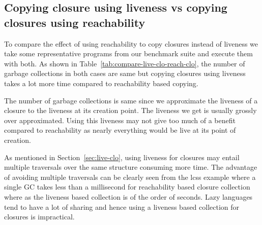 \documentclass[9pt]{sigplanconf}
\newcommand{\comment}[1]{{\color{Myblue}{(#1)}}}
\begin{document}

\subsection{Copying closure using liveness vs copying closures using reachability}\label{sec:strategies}

To compare the  effect of using reachability to  copy closures instead
of liveness we take some representative programs from our benchmark suite and
execute       them      with       both.        As      shown       in
Table~\ref{tab:compare-live-clo-reach-clo},  the   number  of  garbage
collections in both cases are same but copying closures using liveness
takes a lot more time compared to reachability based copying.

The number  of garbage  collections is same  since we  approximate the
liveness of  a closure  to the  liveness at  its creation  point.  The
liveness  we get  is usually  grossly over  approximated.  Using  this
liveness may not  give too much of a benefit  compared to reachability
as nearly everything would be live at its point of creation.

As  mentioned   in  Section~\ref{sec:live-clo},  using   liveness  for
closures  may  entail  multiple  traversals over  the  same  structure
consuming more  time.  The  advantage of avoiding  multiple traversals
can be clearly seen from the lcss example where a single GC takes less
than a millisecond for reachability  based closure collection where as
the  liveness  based collection  is  of  the  order of  seconds.  Lazy
languages tend  to have a  lot of sharing  and hence using  a liveness
based collection for closures is impractical.
\end{document}
